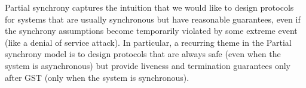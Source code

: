 Partial synchrony captures the intuition that we would like to design protocols for 
systems that are usually synchronous but have reasonable guarantees, 
even if the synchrony assumptions become temporarily violated by some extreme event
(like a denial of service attack). In particular, a recurring theme in the Partial
synchrony model is to design protocols that are always safe (even when the system
is asynchronous) but provide liveness and termination guarantees only
after GST (only when the system is synchronous).






